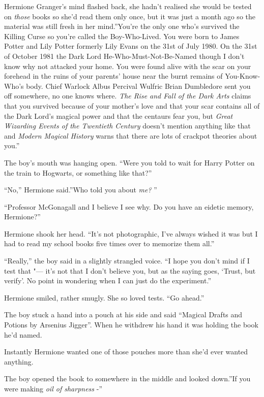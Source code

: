 Hermione Granger's mind flashed back, she hadn't realised she would be
tested on \emph{those} books so she'd read them only once, but it was
just a month ago so the material was still fresh in her mind.''You're
the only one who's survived the Killing Curse so you're called the
Boy-Who-Lived. You were born to James Potter and Lily Potter formerly
Lily Evans on the 31st of July 1980. On the 31st of October 1981 the
Dark Lord He-Who-Must-Not-Be-Named though I don't know why not attacked
your home. You were found alive with the scar on your forehead in the
ruins of your parents' house near the burnt remains of You-Know-Who's
body. Chief Warlock Albus Percival Wulfric Brian Dumbledore sent you off
somewhere, no one knows where. \emph{The Rise and Fall of the Dark Arts}
claims that you survived because of your mother's love and that your
scar contains all of the Dark Lord's magical power and that the centaurs
fear you, but \emph{Great Wizarding Events of the Twentieth Century}
doesn't mention anything like that and \emph{Modern Magical History}
warns that there are lots of crackpot theories about you.''

The boy's mouth was hanging open. ``Were you told to wait for Harry
Potter on the train to Hogwarts, or something like that?''

``No,'' Hermione said.''Who told you about \emph{me?} ''

``Professor McGonagall and I believe I see why. Do you have an eidetic
memory, Hermione?''

Hermione shook her head. ``It's not photographic, I've always wished it
was but I had to read my school books five times over to memorize them
all.''

``Really,'' the boy said in a slightly strangled voice. ``I hope you
don't mind if I test that "--- it's not that I don't believe you, but as
the saying goes, `Trust, but verify'. No point in wondering when I can
just do the experiment.''

Hermione smiled, rather smugly. She so loved tests. ``Go ahead.''

The boy stuck a hand into a pouch at his side and said ``Magical Drafts
and Potions by Arsenius Jigger''. When he withdrew his hand it was
holding the book he'd named.

Instantly Hermione wanted one of those pouches more than she'd ever
wanted anything.

The boy opened the book to somewhere in the middle and looked down.''If
you were making \emph{oil of sharpness} -''

